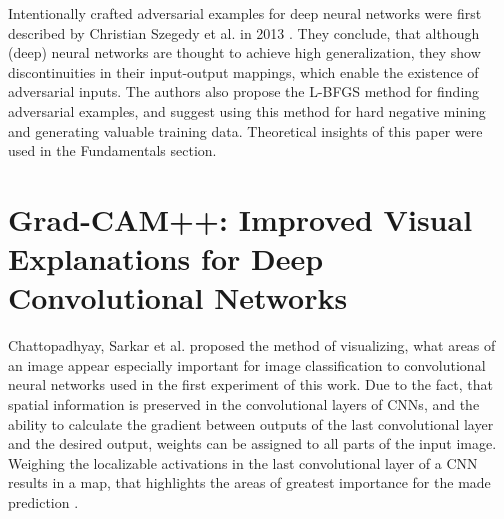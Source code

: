 \documentclass[draft,final]{vutinfth} %
\begin{document}
Intentionally crafted adversarial examples for deep neural networks were first described by Christian Szegedy et al. in 2013 \cite{Szegedy2013}.
They conclude, that although (deep) neural networks are thought to achieve high generalization, they show discontinuities in their input-output mappings, which enable the existence of adversarial inputs.
The authors also propose the L-BFGS method for finding adversarial examples, and suggest using this method for hard negative mining and generating valuable training data.
Theoretical insights of this paper were used in the Fundamentals section.\\
\section{Grad-CAM++: Improved Visual Explanations for Deep Convolutional Networks}
Chattopadhyay, Sarkar et al. proposed the method of visualizing, what areas of an image appear especially important for image classification to convolutional neural networks used in the first experiment of this work. 
Due to the fact, that spatial information is preserved in the convolutional layers of CNNs, and the ability to calculate the gradient between outputs of the last convolutional layer and the desired output, weights can be assigned to all parts of the input image.
Weighing the localizable activations in the last convolutional layer of a CNN results in a map, that highlights the areas of greatest importance for the made prediction \cite{Chattopadhyay2017}.
\end{document}
